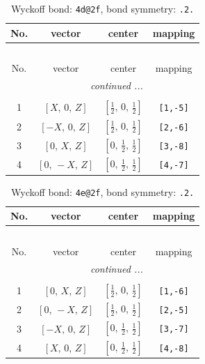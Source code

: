 \documentclass[fleqn,8pt]{jsarticle}
\begin{document}
\begin{longtable}{cccc}
\caption{Wyckoff bond: {\tt 4d@2f}, bond symmetry: {\tt .2.}}
 \\
 \hline \hline
No. & vector & center & mapping \\ \hline \endfirsthead

\multicolumn{3}{l}{\tablename\ \thetable{}} \\
 \hline \hline
No. & vector & center & mapping \\ \hline \endhead

 \hline \hline
\multicolumn{3}{r}{\footnotesize\it continued ...} \\ \endfoot

 \hline \hline
\multicolumn{3}{r}{} \\ \endlastfoot

1 & $\left[ X,\, 0,\, Z \right]$ & $\left[ \frac{1}{2},\, 0,\, \frac{1}{2} \right]$ & {\tt [1,-5]} \\ \hline
2 & $\left[ - X,\, 0,\, Z \right]$ & $\left[ \frac{1}{2},\, 0,\, \frac{1}{2} \right]$ & {\tt [2,-6]} \\ \hline
3 & $\left[ 0,\, X,\, Z \right]$ & $\left[ 0,\, \frac{1}{2},\, \frac{1}{2} \right]$ & {\tt [3,-8]} \\ \hline
4 & $\left[ 0,\, - X,\, Z \right]$ & $\left[ 0,\, \frac{1}{2},\, \frac{1}{2} \right]$ & {\tt [4,-7]} \\
\end{longtable}
\renewcommand{\arraystretch}{1.2}
\begin{longtable}{cccc}
\caption{Wyckoff bond: {\tt 4e@2f}, bond symmetry: {\tt .2.}}
 \\
 \hline \hline
No. & vector & center & mapping \\ \hline \endfirsthead

\multicolumn{3}{l}{\tablename\ \thetable{}} \\
 \hline \hline
No. & vector & center & mapping \\ \hline \endhead

 \hline \hline
\multicolumn{3}{r}{\footnotesize\it continued ...} \\ \endfoot

 \hline \hline
\multicolumn{3}{r}{} \\ \endlastfoot

1 & $\left[ 0,\, X,\, Z \right]$ & $\left[ \frac{1}{2},\, 0,\, \frac{1}{2} \right]$ & {\tt [1,-6]} \\ \hline
2 & $\left[ 0,\, - X,\, Z \right]$ & $\left[ \frac{1}{2},\, 0,\, \frac{1}{2} \right]$ & {\tt [2,-5]} \\ \hline
3 & $\left[ - X,\, 0,\, Z \right]$ & $\left[ 0,\, \frac{1}{2},\, \frac{1}{2} \right]$ & {\tt [3,-7]} \\ \hline
4 & $\left[ X,\, 0,\, Z \right]$ & $\left[ 0,\, \frac{1}{2},\, \frac{1}{2} \right]$ & {\tt [4,-8]} \\
\end{longtable}
\end{document}
